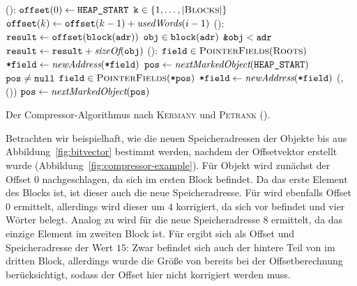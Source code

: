 \begin{algorithm}[h]
\begin{algorithmic}[1]
	\State {}():
	\State \quad $\texttt{offset}(0) \gets \texttt{HEAP\_START}$
	\State \quad \FOR $\texttt{k} \in \{1, \dots, \left\lvert\textsc{Blocks}\right\rvert\}$
	\State \quad \quad $\texttt{offset}(k) \gets \texttt{offset}(k-1) + \textit{usedWords}(i-1)$
	\Statex
	\State {}():
	\State \quad $\texttt{result} \gets \texttt{offset}(\texttt{block}(\texttt{adr}))$	
	\State \quad \FOREACH $\texttt{obj} \in \texttt{block}(\texttt{adr})$
	\State \quad \quad \IF $\texttt{\&obj} < \texttt{adr}$	
	\State \quad \quad \quad $\texttt{result} \gets \texttt{result} + \textit{sizeOf}(\texttt{obj})$
	\State \quad \Return {}
	\Statex
	\State {}():
	\State \quad \FOREACH $\texttt{field} \in \textsc{PointerFields}(\textsc{Roots})$
	\State \quad \quad $\texttt{*field} \gets \textit{newAddress}(\texttt{*field})$
	\State \quad $\texttt{pos} \gets \textit{nextMarkedObject}(\texttt{HEAP\_START})$
	\State \quad \WHILE $\texttt{pos} \neq \texttt{null}$	
	\State \quad \quad \FOREACH $\texttt{field} \in \textsc{PointerFields}(\texttt{*pos})$
	\State \quad \quad \quad $\texttt{*field} \gets \textit{newAddress}(\texttt{*field})$
	\State \quad \quad {}(, ())
	\State \quad \quad $\texttt{pos} \gets \textit{nextMarkedObject}(\texttt{pos})$
\end{algorithmic}
\caption[Compressor-Algorithmus]{Der Compressor-Algorithmus nach \textsc{Kermany} und \textsc{Petrank} (\cite{kermany2006}).}
\label{algo:compressor}
\end{algorithm}

Betrachten wir beispielhaft, wie die neuen Speicheradressen der Objekte  bis  aus Abbildung~\ref{fig:bitvector} bestimmt werden, nachdem der Offsetvektor erstellt wurde (Abbildung~\ref{fig:compressor-example}).
Für Objekt  wird zunächst der Offset $0$ nachgeschlagen, da sich  im ersten Block befindet.
Da  das erste Element des Blocks ist, ist dieser auch die neue Speicheradresse.
Für  wird ebenfalls Offset $0$ ermittelt, allerdings wird dieser um $4$ korrigiert, da sich  vor  befindet und vier Wörter belegt.
Analog zu  wird für  die neue Speicheradresse $8$ ermittelt, da  das einzige Element im zweiten Block ist.
Für  ergibt sich als Offset und Speicheradresse der Wert $15$:
Zwar befindet sich auch der hintere Teil von  im dritten Block, allerdings wurde die Größe von  bereits bei der Offsetberechnung berücksichtigt, sodass der Offset hier nicht korrigiert werden muss.

